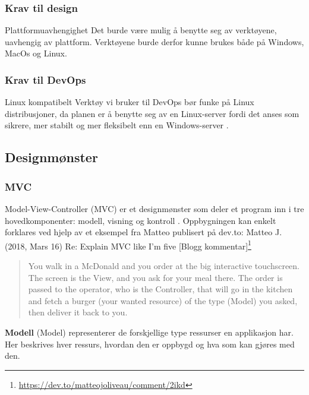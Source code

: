 \subsubsection{Krav til design}
\begin{compactdesc}
\item [Plattformuavhengighet] Det burde være mulig å benytte seg av verktøyene, uavhengig av plattform. Verktøyene burde derfor kunne brukes både på Windows, MacOs og Linux.
\end{compactdesc}

\subsubsection{Krav til DevOps}
\begin{compactdesc}
\item [Linux kompatibelt] Verktøy vi bruker til DevOps bør funke på Linux distribusjoner, da planen er å benytte seg av en Linux-server fordi det anses som sikrere, mer stabilt og mer fleksibelt enn en Windows-server \cite{cabrera2009windows}.
\end{compactdesc}

\subsection{Designmønster}

\subsubsection{MVC}
\label{sec:tools-mvc}
Model-View-Controller (MVC)\cite{burbeck87aps} er et designmønster som deler et program inn i tre hovedkomponenter: modell, visning og kontroll \cite{burbeck87aps}. Oppbygningen kan enkelt forklares ved hjelp av et eksempel fra Matteo publisert på dev.to:
Matteo J. (2018, Mars 16) Re: Explain MVC like I'm five [Blogg kommentar]\footnote{\url{https://dev.to/matteojoliveau/comment/2ikd}}
\begin{quote}
    You walk in a McDonald and you order at the big interactive touchscreen.
    The screen is the View, and you ask for your meal there.
    The order is passed to the operator, who is the Controller, that will go in the kitchen and fetch a burger (your wanted resource) of the type (Model) you asked, then deliver it back to you.
\end{quote}

\textbf{Modell} (Model) representerer de forskjellige type ressurser en applikasjon har. Her beskrives hver ressurs, hvordan den er oppbygd og hva som kan gjøres med den.

